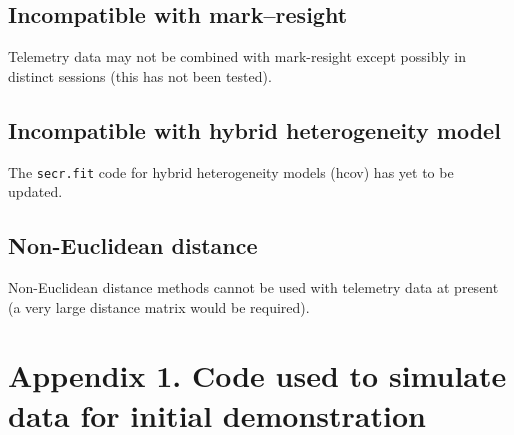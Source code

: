 \documentclass[
]{book}
\begin{document}
\subsection{Incompatible with mark--resight}\label{incompatible-with-markresight}

Telemetry data may not be combined with mark-resight except possibly in distinct sessions (this has not been tested).

\subsection{Incompatible with hybrid heterogeneity model}\label{incompatible-with-hybrid-heterogeneity-model}

The \texttt{secr.fit} code for hybrid heterogeneity models (hcov) has yet to be updated.

\subsection{Non-Euclidean distance}\label{non-euclidean-distance}

Non-Euclidean distance methods cannot be used with telemetry data at present (a very large distance matrix would be required).

\section{Appendix 1. Code used to simulate data for initial demonstration}\label{telemetryappendix1}
\end{document}
